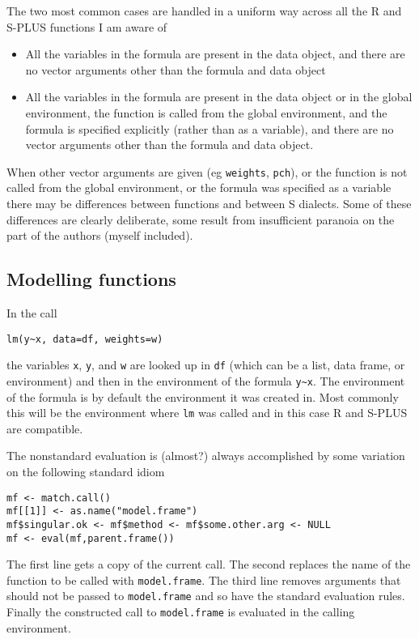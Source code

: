 \documentclass[11pt]{article}
\begin{document}
The two most common cases are handled in a uniform way across all the
R and S-PLUS functions I am aware of
\begin{itemize}
\item All the variables in the formula are present in the data object, and there are no vector arguments other than the formula and data object
\item All the variables in the formula are present in the data object or in the global environment, the function is called from the global environment, and the formula is specified explicitly (rather than as a variable), and there are no vector arguments other than the formula and data object.
\end{itemize}

When other vector arguments are given (eg \texttt{weights}, \texttt{pch}), or the function is not called from the global environment, or the formula was specified as a variable there may be differences between functions and between S dialects. Some of these differences are clearly deliberate, some result from insufficient paranoia on the part of the authors (myself included).

\subsection{Modelling functions}
In the call
\begin{verbatim}
lm(y~x, data=df, weights=w)
\end{verbatim}
the variables \verb=x=, \verb=y=, and \verb=w= are looked up in \verb=df= (which can be a list, data frame, or environment) and then in the environment of the formula \verb=y~x=.  The environment of the formula is by default the environment it was created in.  Most commonly this will be the environment where \verb=lm= was called and in this case R and S-PLUS are compatible.

The nonstandard evaluation is (almost?) always accomplished by some variation on the following standard idiom
\begin{verbatim}
mf <- match.call()
mf[[1]] <- as.name("model.frame")
mf$singular.ok <- mf$method <- mf$some.other.arg <- NULL
mf <- eval(mf,parent.frame())
\end{verbatim}

The first line gets a copy of the current call. The second replaces the name of the function to be called with \texttt{model.frame}. The third line removes arguments that should not be passed to \texttt{model.frame} and so have the standard evaluation rules.  Finally the constructed call to \texttt{model.frame} is evaluated in the calling environment.
\end{document}

